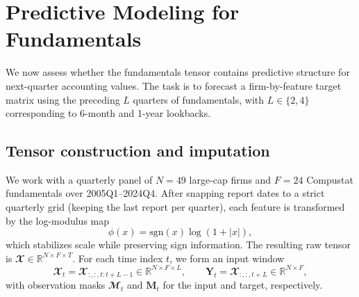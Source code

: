 

\section{Predictive Modeling for Fundamentals}
\label{Section:Predictive_Fundamentals}

We now assess whether the fundamentals tensor contains predictive structure for next-quarter accounting values. The task is to forecast a firm-by-feature target matrix using the preceding $L$ quarters of fundamentals, with $L \in \{2,4\}$ corresponding to 6-month and 1-year lookbacks.

\subsection{Tensor construction and imputation}
\label{Section:Tensor_Imputation}

We work with a quarterly panel of $N=49$ large-cap firms and $F=24$ Compustat fundamentals over 2005Q1--2024Q4. After snapping report dates to a strict quarterly grid (keeping the last report per quarter), each feature is transformed by the log-modulus map
\begin{equation}
\phi(x) = \mathrm{sgn}(x)\log(1 + |x|),
\end{equation}
which stabilizes scale while preserving sign information. The resulting raw tensor is
$\mathbfcal{X} \in \mathbb{R}^{N \times F \times T}$.
For each time index $t$, we form an input window
\begin{equation}
\mathbfcal{X}_t = \mathbfcal{X}_{:,:,t:t+L-1} \in \mathbb{R}^{N \times F \times L},
\qquad
\mathbf{Y}_t = \mathbfcal{X}_{:,:,t+L} \in \mathbb{R}^{N \times F},
\end{equation}
with observation masks $\mathbfcal{M}_t$ and $\mathbf{M}_t$ for the input and target, respectively.

